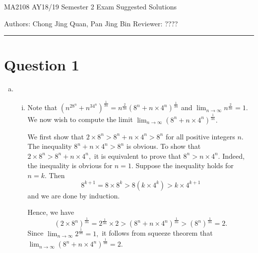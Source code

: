 \documentclass{article}
\begin{document}
    {\LARGE{MA2108 AY18/19 Semester 2 Exam Suggested Solutions}}
    \vspace{0.2in}
    
    Authors: Chong Jing Quan, Pan Jing Bin \hfill Reviewer: ????
    
    \par\noindent\rule{\textwidth}{0.4pt}
\section*{Question 1}
\begin{enumerate}[(a)]
    \item \begin{enumerate}[(i)]
        \item Note that $\displaystyle(n^28^n+n^34^n)^{\frac{1}{3n}}=n^{\frac{2}{3n}}(8^n+n\times4^n)^{\frac{1}{3n}}$ and $\displaystyle\lim_{n\to\infty}n^{\frac{2}{3n}}=1.$ We now wish to compute the limit $\displaystyle\lim_{n\to\infty}(8^n+n\times4^n)^{\frac{1}{3n}}.$
        
        We first show that $2\times8^n>8^n+n\times4^n>8^n$ for all positive integers $n.$ The inequality $8^n+n\times 4^n>8^n$ is obvious. To show that $2\times8^n>8^n+n\times4^n,$ it is equivalent to prove that $8^n>n\times4^n.$ Indeed, the inequality is obvious for $n=1.$ Suppose the inequality holds for $n=k.$ Then $$8^{k+1}=8\times8^k>8(k\times 4^k)>k\times 4^{k+1}$$ and we are done by induction.
        
        Hence, we have $$(2\times8^n)^{\frac{1}{3n}}=2^{\frac{1}{3n}}\times2>(8^n+n\times4^n)^{\frac{1}{3n}}>(8^n)^{\frac{1}{3n}}=2.$$
        Since $\displaystyle\lim_{n\to\infty}2^{\frac{1}{3n}}=1,$ it follows from squeeze theorem that $\displaystyle\lim_{n\to\infty}(8^n+n\times4^n)^{\frac{1}{3n}}=2.$
        

\end{enumerate}
\end{enumerate}
\end{document}
